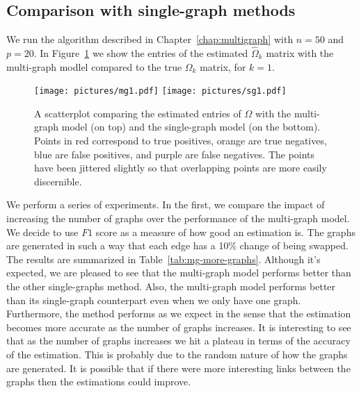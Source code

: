 \documentclass[a4paper, 11pt, oneside]{report}
\newcommand{\1}{\mathds{1}}
\begin{document}
\subsection{Comparison with single-graph methods}
We run the algorithm described in Chapter~\ref{chap:multigraph} with $n=50$ and $p=20$.
In Figure~\ref{fig:omega-mg} we show the entries of the estimated $\hat \Omega_k$ matrix with the multi-graph modlel compared to the true $\Omega_k$ matrix, for $k = 1$.
\begin{figure}[ht]
  \centering
    \texttt{[image: pictures/mg1.pdf]}
    \texttt{[image: pictures/sg1.pdf]}
  \caption{A scatterplot comparing the estimated entries of $\Omega$ with the multi-graph model (on top) and the single-graph model (on the bottom). Points in red correspond to true positives, orange are true negatives, blue are false positives, and purple are false negatives. The points have been jittered slightly so that overlapping points are more easily discernible.}
  \label{fig:omega-mg}
\end{figure}

We perform a series of experiments. In the first, we compare the impact
of increasing the number of graphs over the performance of the multi-graph model.
We decide to use $F1$ score as a measure of how good an estimation is.
The graphs are generated in such a way that each edge has a 10\% change of being swapped.
The results are summarized in Table~\ref{tab:mg-more-graphs}. 
Although it's expected, we are pleased to see that the multi-graph model performs better than the other single-graphs method.
Also, the multi-graph model performs better than its single-graph counterpart even when we only have one graph.
Furthermore, the method performs as we expect in the sense that the estimation becomes more accurate as the number of graphs increases.
It is interesting to see that as the number of graphs increases we hit a plateau in terms of the accuracy of the estimation.
This is probably due to the random nature of how the graphs are generated.
It is possible that if there were more interesting links between the graphs then the estimations could improve.
\end{document}
